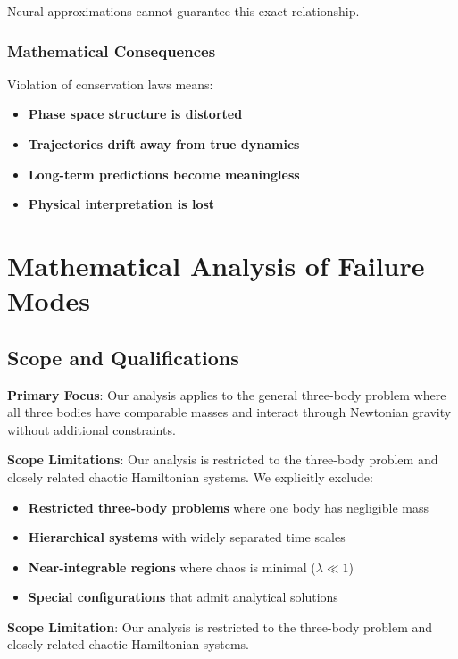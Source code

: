 \documentclass[11pt,a4paper]{article}
\begin{document}
Neural approximations cannot guarantee this exact relationship.

\subsubsection{Mathematical Consequences}

Violation of conservation laws means:
\begin{itemize}
    \item \textbf{Phase space structure is distorted}
    \item \textbf{Trajectories drift away from true dynamics}
    \item \textbf{Long-term predictions become meaningless}
    \item \textbf{Physical interpretation is lost}
\end{itemize}

\section{Mathematical Analysis of Failure Modes}

\subsection{Scope and Qualifications}

\textbf{Primary Focus}: Our analysis applies to the general three-body problem where all three bodies have comparable masses and interact through Newtonian gravity without additional constraints.

\textbf{Scope Limitations}: Our analysis is restricted to the three-body problem and closely related chaotic Hamiltonian systems. We explicitly exclude:
\begin{itemize}
    \item \textbf{Restricted three-body problems} where one body has negligible mass
    \item \textbf{Hierarchical systems} with widely separated time scales
    \item \textbf{Near-integrable regions} where chaos is minimal ($\lambda \ll 1$)
    \item \textbf{Special configurations} that admit analytical solutions
\end{itemize}

\textbf{Scope Limitation}: Our analysis is restricted to the three-body problem and closely related chaotic Hamiltonian systems.
\end{document}
